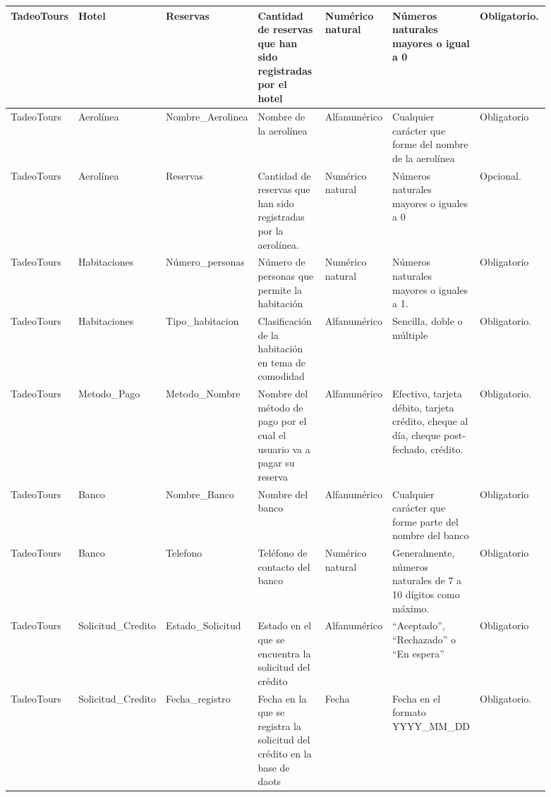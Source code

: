 \documentclass{article}
\begin{document}
\begin{landscape}
\begin{longtable}{|C{0.102\linewidth}|C{0.102\linewidth}|C{0.142\linewidth}|C{0.142\linewidth}|C{0.122\linewidth}|C{0.142\linewidth}|C{0.142\linewidth}|}
TadeoTours & Hotel & Reservas & Cantidad de reservas que han sido registradas por el hotel & Numérico natural & Números naturales mayores o igual a 0 & Obligatorio. \\ \hline

TadeoTours & Aerolínea & Nombre\_Aerolinea & Nombre de la aerolínea & Alfanumérico & Cualquier carácter que forme del nombre de la aerolínea & Obligatorio \\ \hline

TadeoTours & Aerolínea & Reservas & Cantidad de reservas que han sido registradas por la aerolínea. & Numérico natural & Números naturales mayores o iguales a 0 & Opcional. \\ \hline

TadeoTours & Habitaciones & Número\_personas & Número de personas que permite la habitación & Numérico natural & Números naturales mayores o iguales a 1. & Obligatorio \\ \hline

TadeoTours & Habitaciones & Tipo\_habitacion & Clasificación de la habitación en tema de comodidad & Alfanumérico & Sencilla, doble o múltiple & Obligatorio. \\ \hline

TadeoTours & Metodo\_Pago & Metodo\_Nombre & Nombre del método de pago por el cual el usuario va a pagar su reserva & Alfanumérico & Efectivo, tarjeta débito, tarjeta crédito, cheque al día, cheque post-fechado, crédito. & Obligatorio. \\ \hline

TadeoTours & Banco & Nombre\_Banco & Nombre del banco & Alfanumérico & Cualquier carácter que forme parte del nombre del banco & Obligatorio \\ \hline

TadeoTours & Banco & Telefono & Teléfono de contacto del banco & Numérico natural & Generalmente, números naturales de 7 a 10 dígitos como máximo. & Obligatorio \\ \hline

TadeoTours & Solicitud\_Credito & Estado\_Solicitud & Estado en el que se encuentra la solicitud del crédito & Alfanumérico & ``Aceptado'', ``Rechazado'' o ``En espera'' & Obligatorio \\ \hline

TadeoTours & Solicitud\_Credito & Fecha\_registro & Fecha en la que se registra la solicitud del crédito en la base de daots & Fecha & Fecha en el formato YYYY\_MM\_DD & Obligatorio. \\ \hline


\end{longtable}
\end{landscape}
\end{document}
